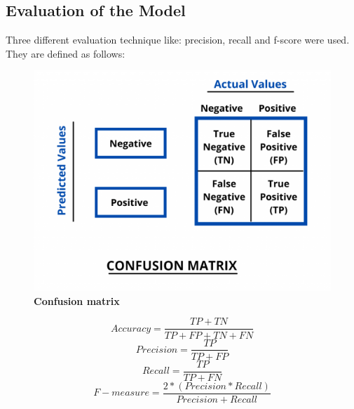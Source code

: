 \documentclass[12pt]{report}
\begin{document}
        \subsection{Evaluation of the Model}
        Three different evaluation technique like: precision, recall and f-score were used.
        They are defined as follows:
        \begin{figure}[h]
            \centering
            \includegraphics[scale=0.4]{confusion_matrix.png}
            \caption{\textbf{Confusion matrix}}
        \end{figure}
            \begin{center}
                \begin{equation}
                    Accuracy = \frac{TP + TN }{TP + FP  + TN + FN}
                \end{equation}
                \begin{equation}
                    Precision = \frac{TP}{TP + FP}
                \end{equation}
                \begin{equation}
                    Recall= \frac{TP}{TP + FN}
                \end{equation}
                \begin{equation}
                    F-measure= \frac{2 * (Precision * Recall)}{Precision +  Recall}
                \end{equation}
            \end{center}
\end{document}
